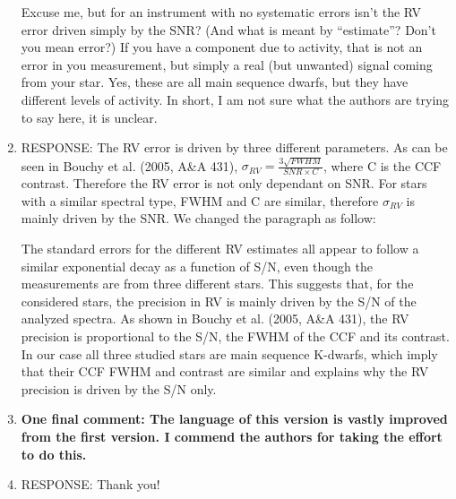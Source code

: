 \documentclass[11pt]{article}   	%
\begin{document}
\begin{enumerate}
{Excuse me, but for an instrument with no systematic errors isn't the RV error driven simply by the SNR? (And what is meant by ``estimate''? Don't you mean error?) If you have a component due to activity, that is not an error in you measurement, but simply a real (but unwanted) signal coming from your star. Yes, these are all main sequence dwarfs, but they have different levels of activity. In short, I am not sure what the authors are trying to say here, it is unclear.}
%
\item[]  RESPONSE:  The RV error is driven by three different parameters. As can be seen in Bouchy et al. (2005, A\&A 431), $\sigma_{RV} = \frac{3\sqrt{FWHM}}{SNR\times C}$, where C is the CCF contrast. Therefore the RV error is not only dependant on SNR. For stars with a similar spectral type, FWHM and C are similar, therefore $\sigma_{RV}$ is mainly driven by the SNR.
We changed the paragraph as follow: 

The standard errors for the different RV estimates all appear to follow a similar exponential decay as a function of S/N, even though the measurements are from three different stars. This suggests that, for the considered stars, the precision in RV is mainly driven by the S/N of the analyzed spectra. As shown in Bouchy et al. (2005, A\&A 431), the RV precision is proportional to the S/N, the FWHM of the CCF and its contrast. In our case all three studied stars are main sequence K-dwarfs, which imply that their CCF FWHM and contrast are similar and explains why the RV precision is driven by the S/N only.



\bigskip
%
%
\item {\bf One final comment: The language of this version is vastly improved from the first version. I commend the authors for taking the effort to do this.}
%
\item[]  RESPONSE:  Thank you!
\bigskip
%
%
\end{enumerate}
\end{document}
